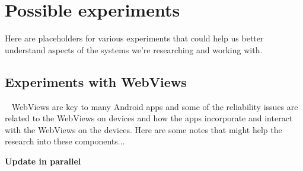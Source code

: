 \section{Possible experiments}
Here are placeholders for various experiments that could help us better understand aspects of the systems we're researching and working with.

\subsection{Experiments with WebViews}~\label{section-experiments-with-webviews}
WebViews are key to many Android apps and some of the reliability issues are related to the WebViews on devices and how the apps incorporate and interact with the WebViews on the devices. Here are some notes that might help the research into these components...

\textbf{Update in parallel}


